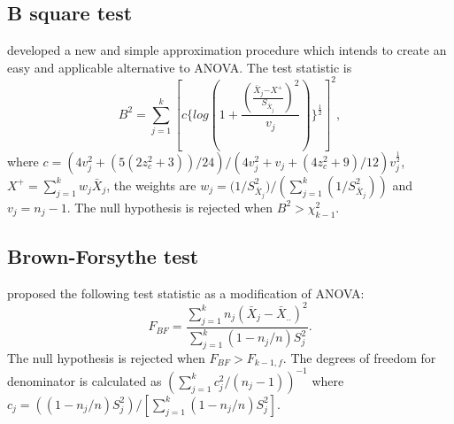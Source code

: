 \subsection{B square test} %
\cite{ozdemir2006one} developed a new and simple approximation procedure which intends to create an easy and applicable alternative to ANOVA. The test statistic is
\begin{equation}
B^2=\displaystyle\sum\limits_{j=1}^k[c \lbrace log (1+\frac{(\frac{\bar{X}_j{-X^+}}{S_{\bar{X}_j}})^2}{v_j})\rbrace^\frac 1 2]^2 ,
\end{equation}
where \begin{math}
c=({4v_j^2+({5(2z_c^2+3)})/{24}})/({4v_j^2+v_j+({4z_c^2+9})/{12}})v_j^\frac1 2
\end{math}, \begin{math}
X^+=\displaystyle\sum\limits_{j=1}^k w_j\bar{X}_j 
\end{math}, the weights are \begin{math}
w_j={({1}/{S_{\bar{X}_j}^2}})/({\displaystyle\sum\limits_{j=1}^k ({1}/{S_{\bar{X}_j}^2})}) \end{math} and \begin{math}
v_j=n_j-1 \end{math}.
The null hypothesis is rejected when \begin{math} B^2>\chi_{k-1}^2 \end{math}.




\subsection{Brown-Forsythe test}

\citet{brown1974a, brown1974b} proposed the following test statistic as a modification of ANOVA:
\begin{equation}
F_{BF}=\frac{\displaystyle\sum_{j=1}^{k} n_{j}(\bar{X}_{j}-\bar{X}_{..})^2}{\displaystyle\sum_{j=1}^{k}(1-n_j/n)S_j^2}.
\end{equation}
The null hypothesis is rejected when \begin{math} F_{BF}>F_{k-1, f} \end{math}. The degrees of freedom for denominator is calculated as
\begin{math}
\left(\displaystyle\sum_{j=1}^{k}c_j^2/(n_j-1)\right)^{-1}
\end{math} where 
\noindent  \begin{math}
c_j=({(1-n_j/n)S_j^2})/{\left[ \displaystyle\sum_{j=1}^{k} (1-n_j/n)S_j^2\right ]} \end{math}.

